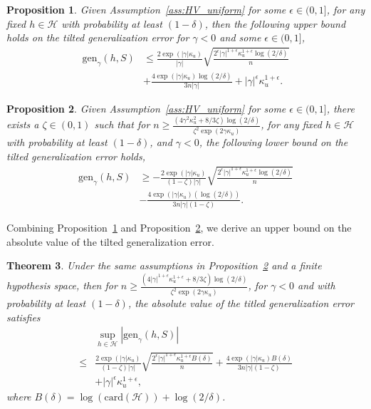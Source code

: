 \documentclass{article}
\theoremstyle{plain}
\theoremstyle{plain}
\newtheorem{theorem}{Theorem}[section]
\newtheorem{proposition}[theorem]{Proposition}
\theoremstyle{definition}
\theoremstyle{remark}
\newcommand{\nn}{\nonumber}
\begin{document}
\begin{proposition}\label{prop: upper uniform unbounded}
     Given Assumption~\ref{ass:HV_uniform} for some $\epsilon\in(0,1]$, for any fixed $h\in\mathcal{H}$ with probability at least $(1-\delta)$, then the following upper bound holds on the tilted generalization error for $\gamma<0$ and some $\epsilon\in(0,1]$, 
    \begin{equation*}
    \begin{split}
      \mathrm{gen}_{\gamma}(h,S)&\leq \frac{2\exp(|\gamma| \kappa_u)}{|\gamma|}\sqrt{\frac{2^{\epsilon}|\gamma|^{1+\epsilon}\kappa_u^{1+\epsilon}\log(2/\delta)}{n}}\\&+\frac{4\exp(|\gamma| \kappa_u)\log(2/\delta)}{3n|\gamma|}+|\gamma|^{\epsilon}\kappa_u^{1+\epsilon}.
      \end{split}
    \end{equation*}    
\end{proposition}
\begin{proposition}\label{prop: lower uniform unbounded}
        Given Assumption~\ref{ass:HV_uniform} for some $\epsilon\in(0,1]$, there exists a $\zeta\in(0,1)$ such that for $n\geq \frac{(4\gamma^2\kappa_u^2+8/3 \zeta )\log(2/\delta)}{\zeta^2\exp(2\gamma \kappa_u)}$, for any fixed $h\in\mathcal{H}$ with probability at least $(1-\delta)$, and $\gamma<0$, the following lower bound on the tilted generalization error holds,
    \begin{equation*} 
    \begin{split}
    \mathrm{gen}_{\gamma}(h,S)&\geq -\frac{2\exp(|\gamma| \kappa_u)}{(1-\zeta)|\gamma|}\sqrt{\frac{2^{\epsilon}|\gamma|^{1+\epsilon}\kappa_u^{1+\epsilon}\log(2/\delta)}{n}} \\&-\frac{4\exp(|\gamma| \kappa_u)(\log(2/\delta))}{3n|\gamma|(1-\zeta)}. 
        \end{split}
\end{equation*}
\end{proposition}
Combining Proposition~\ref{prop: upper uniform unbounded} and Proposition~\ref{prop: lower uniform unbounded}, we derive an upper bound on the absolute value of the tilted generalization error.
\begin{theorem}\label{thm: Abs gen unbounded}
    Under the same assumptions in Proposition~\ref{prop: lower uniform unbounded} and a finite hypothesis space, then for $n\geq \frac{(4|\gamma|^{1+\epsilon}\kappa_u^{1+\epsilon}+8/3 \zeta )\log(2/\delta)}{\zeta^2\exp(2\gamma \kappa_u)}$, for $\gamma<0$ and with probability at least $(1-\delta)$, the absolute value of the titled generalization error satisfies 
    \begin{align}
&\sup_{h\in\mathcal{H}}|\mathrm{gen}_{\gamma}(h,S)|\\\nn\leq &\frac{2\exp(|\gamma| \kappa_u)}{(1-\zeta)|\gamma|}\sqrt{\frac{2^{\epsilon}|\gamma|^{1+\epsilon}\kappa_u^{1+\epsilon}B(\delta)}{n}} +\frac{4\exp(|\gamma| \kappa_u)B(\delta)}{3n|\gamma|(1-\zeta)}\nn\\& \nn +|\gamma|^{\epsilon}\kappa_u^{1+\epsilon},
             \end{align}
              where $B(\delta)= \log(\mathrm{card}(\mathcal{H}))+\log(2/\delta)$.
\end{theorem}
\end{document}
